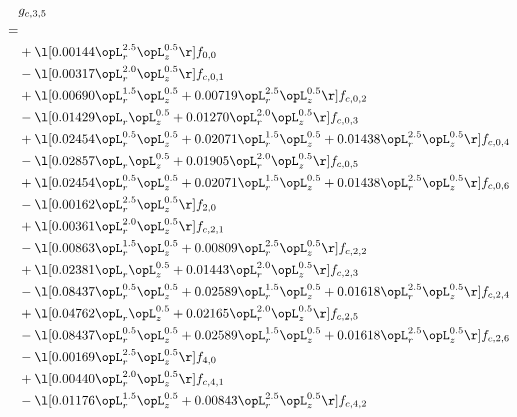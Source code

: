 \begin{alignat}{2} 
\label{eq:g_35_0} 
& g_{c,3,5} \nonumber \\ 
 = \\ 
& + \l[  0.00144 \opL_r^{2.5} \opL_z^{0.5}  \r] f_{0,0} \nonumber \\ 
& - \l[  0.00317 \opL_r^{2.0} \opL_z^{0.5}  \r] f_{c,0,1} \nonumber \\ 
& + \l[  0.00690 \opL_r^{1.5} \opL_z^{0.5} +  0.00719 \opL_r^{2.5} \opL_z^{0.5}  \r] f_{c,0,2} \nonumber \\ 
& - \l[  0.01429 \opL_r \opL_z^{0.5} +  0.01270 \opL_r^{2.0} \opL_z^{0.5}  \r] f_{c,0,3} \nonumber \\ 
& + \l[  0.02454 \opL_r^{0.5} \opL_z^{0.5} +  0.02071 \opL_r^{1.5} \opL_z^{0.5} +  0.01438 \opL_r^{2.5} \opL_z^{0.5}  \r] f_{c,0,4} \nonumber \\ 
& - \l[  0.02857 \opL_r \opL_z^{0.5} +  0.01905 \opL_r^{2.0} \opL_z^{0.5}  \r] f_{c,0,5} \nonumber \\ 
& + \l[  0.02454 \opL_r^{0.5} \opL_z^{0.5} +  0.02071 \opL_r^{1.5} \opL_z^{0.5} +  0.01438 \opL_r^{2.5} \opL_z^{0.5}  \r] f_{c,0,6} \nonumber \\ 
& - \l[  0.00162 \opL_r^{2.5} \opL_z^{0.5}  \r] f_{2,0} \nonumber \\ 
& + \l[  0.00361 \opL_r^{2.0} \opL_z^{0.5}  \r] f_{c,2,1} \nonumber \\ 
& - \l[  0.00863 \opL_r^{1.5} \opL_z^{0.5} +  0.00809 \opL_r^{2.5} \opL_z^{0.5}  \r] f_{c,2,2} \nonumber \\ 
& + \l[  0.02381 \opL_r \opL_z^{0.5} +  0.01443 \opL_r^{2.0} \opL_z^{0.5}  \r] f_{c,2,3} \nonumber \\ 
& - \l[  0.08437 \opL_r^{0.5} \opL_z^{0.5} +  0.02589 \opL_r^{1.5} \opL_z^{0.5} +  0.01618 \opL_r^{2.5} \opL_z^{0.5}  \r] f_{c,2,4} \nonumber \\ 
& + \l[  0.04762 \opL_r \opL_z^{0.5} +  0.02165 \opL_r^{2.0} \opL_z^{0.5}  \r] f_{c,2,5} \nonumber \\ 
& - \l[  0.08437 \opL_r^{0.5} \opL_z^{0.5} +  0.02589 \opL_r^{1.5} \opL_z^{0.5} +  0.01618 \opL_r^{2.5} \opL_z^{0.5}  \r] f_{c,2,6} \nonumber \\ 
& - \l[  0.00169 \opL_r^{2.5} \opL_z^{0.5}  \r] f_{4,0} \nonumber \\ 
& + \l[  0.00440 \opL_r^{2.0} \opL_z^{0.5}  \r] f_{c,4,1} \nonumber \\ 
& - \l[  0.01176 \opL_r^{1.5} \opL_z^{0.5} +  0.00843 \opL_r^{2.5} \opL_z^{0.5}  \r] f_{c,4,2} \nonumber \\ 

\end{alignat}
